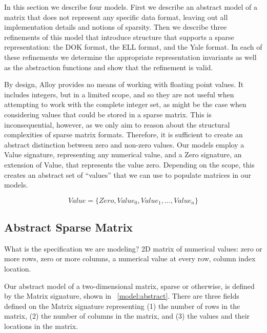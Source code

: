 \documentclass[11pt,conference]{IEEEtran}
\begin{document}
In this section we describe four models.  First we describe an abstract model of a matrix that does not represent any specific data format, leaving out all implementation details and notions of sparsity. Then we describe three refinements of this model that introduce structure that supports a sparse representation: the DOK format, the ELL format, and the Yale format.  In each of these refinements we determine the appropriate representation invariants as well as the abstraction functions and show that the refinement is valid.

By design, Alloy provides no means of working with floating point values.  It includes integers, but in a limited scope, and so they are not useful when attempting to work with the complete integer set, as might be the case when considering values that could be stored in a sparse matrix.  This is inconsequential, however, as we only aim to reason about the structural complexities of sparse matrix formats.  Therefore, it is sufficient to create an abstract distinction between zero and non-zero values.  Our models employ a Value signature, representing any numerical value, and a Zero signature, an extension of Value, that represents the value zero.  Depending on the scope, this creates an abstract set of ``values'' that we can use to populate matrices in our models.

\begin{displaymath}
Value = \{Zero, Value_0, Value_1, \ldots, Value_n\}
\end{displaymath}

\subsection{Abstract Sparse Matrix}

What is the specification we are modeling?  2D matrix of numerical values: zero or more rows, zero or more columns, a numerical value at every row, column index location.

Our abstract model of a two-dimensional matrix, sparse or otherwise, is defined by the Matrix signature, shown in \figurename~\ref{model:abstract}.  There are three fields defined on the Matrix signature representing (1) the number of rows in the matrix, (2) the number of columns in the matrix, and (3) the values and their locations in the matrix.
\end{document}
